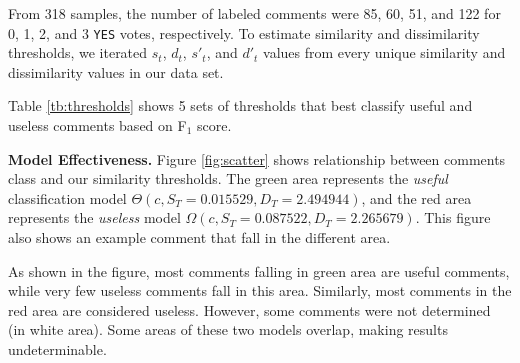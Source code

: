 
%

From 318 samples, the number of labeled comments were 85, 60, 51, and 122 for 0, 1, 2, and 3 \texttt{YES} votes, respectively.
To estimate similarity and dissimilarity thresholds, we iterated $s_t$, $d_t$, $s'_t$, and $d'_t$ values from every unique similarity and dissimilarity values in our data set.
  
Table \ref{tb:thresholds} shows 5 sets of thresholds that best classify useful and useless comments based on F$_1$ score.

\textbf{Model Effectiveness.}
Figure \ref{fig:scatter} shows relationship between comments class and our similarity thresholds.
The green area represents the \emph{useful} classification model $\Theta(c,S_T=0.015529,D_T=2.494944)$, and the red area represents the \emph{useless} model $\Omega(c,S_T=0.087522,D_T=2.265679)$.
This figure also shows an example comment that fall in the different area.

As shown in the figure, most comments falling in green area are useful comments, while very few useless comments fall in this area.
Similarly, most comments in the red area are considered useless.
However, some comments were not determined (in white area).
Some areas of these two models overlap, making results undeterminable.

